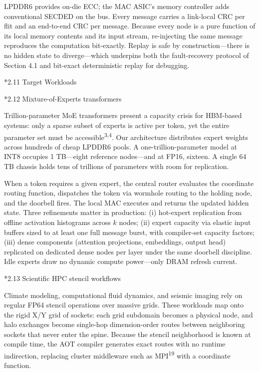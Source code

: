 \documentclass[12pt]{article}
\makeatletter
\renewcommand\subsection{\@startsection{subsection}{2}{\z@}{-1.0ex \@plus -0.2ex}{0.3ex}{\normalsize\bfseries}}
\makeatother
\begin{document}
LPDDR6 provides on-die ECC; the MAC ASIC's memory controller adds conventional SECDED on the bus. Every message carries a link-local CRC per flit and an end-to-end CRC per message. Because every node is a pure function of its local memory contents and its input stream, re-injecting the same message reproduces the computation bit-exactly. Replay is safe by construction---there is no hidden state to diverge---which underpins both the fault-recovery protocol of Section 4.1 and bit-exact deterministic replay for debugging.

\subsection*{2.11 Target Workloads}

\subsection*{2.12 Mixture-of-Experts transformers}

Trillion-parameter MoE transformers present a capacity crisis for HBM-based systems: only a sparse subset of experts is active per token, yet the entire parameter set must be accessible\textsuperscript{3,4}. Our architecture distributes expert weights across hundreds of cheap LPDDR6 pools. A one-trillion-parameter model at INT8 occupies 1 TB---eight reference nodes---and at FP16, sixteen. A single 64 TB chassis holds tens of trillions of parameters with room for replication.

When a token requires a given expert, the central router evaluates the coordinate routing function, dispatches the token via wormhole routing to the holding node, and the doorbell fires. The local MAC executes and returns the updated hidden state. Three refinements matter in production: (i) hot-expert replication from offline activation histograms across $k$ nodes; (ii) expert capacity via elastic input buffers sized to at least one full message burst, with compiler-set capacity factors; (iii) dense components (attention projections, embeddings, output head) replicated on dedicated dense nodes per layer under the same doorbell discipline. Idle experts draw no dynamic compute power---only DRAM refresh current.

\subsection*{2.13 Scientific HPC stencil workflows}

Climate modeling, computational fluid dynamics, and seismic imaging rely on regular FP64 stencil operations over massive grids. These workloads map onto the rigid X/Y grid of sockets: each grid subdomain becomes a physical node, and halo exchanges become single-hop dimension-order routes between neighboring sockets that never enter the spine. Because the stencil neighborhood is known at compile time, the AOT compiler generates exact routes with no runtime indirection, replacing cluster middleware such as MPI\textsuperscript{19} with a coordinate function.
\end{document}
